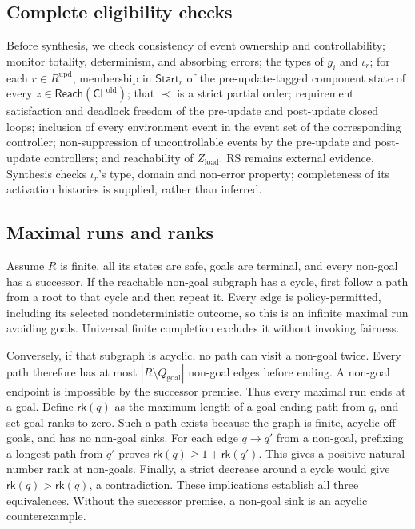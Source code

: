 \documentclass[11pt]{article}
\newcommand{\Goal}{Q_{\mathrm{goal}}}
\newcommand{\rank}{\mathsf{rk}}
\newcommand{\Reach}{\mathsf{Reach}}
\begin{document}
\subsection{Complete eligibility checks}
Before synthesis, we check
consistency of event ownership and controllability;
monitor totality, determinism, and absorbing errors; the types of $g_i$ and $\iota_r$; for each $r\in R^{\mathrm{upd}}$, membership in $\mathsf{Start}_r$ of the pre-update-tagged component state of every $z\in\Reach(\mathsf{CL}^{\mathrm{old}})$;
that $\prec$ is a strict partial order; requirement satisfaction and deadlock freedom of the pre-update and post-update closed loops; inclusion of every environment event in the event set of the corresponding controller;
non-suppression of uncontrollable events by the pre-update and post-update controllers; and
reachability of $Z_{\mathrm{load}}$. RS remains external evidence. Synthesis checks $\iota_r$'s type, domain and non-error property; completeness of its activation histories is supplied, rather than inferred.

\subsection{Maximal runs and ranks}
Assume $R$ is finite, all its states are safe, goals are terminal, and every non-goal has a successor. If the reachable non-goal subgraph has a cycle, first follow a path from a root to that cycle and then repeat it. Every edge is policy-permitted, including its selected nondeterministic outcome, so this is an infinite maximal run avoiding goals. Universal finite completion excludes it without invoking fairness.

Conversely, if that subgraph is acyclic, no path can visit a non-goal twice. Every path therefore has at most $|R\setminus\Goal|$ non-goal edges before ending. A non-goal endpoint is impossible by the successor premise. Thus every maximal run ends at a goal. Define $\rank(q)$ as the maximum length of a goal-ending path from $q$, and set goal ranks to zero. Such a path exists because the graph is finite, acyclic off goals, and has no non-goal sinks. For each edge $q\to q'$ from a non-goal, prefixing a longest path from $q'$ proves $\rank(q)\geq1+\rank(q')$. This gives a positive natural-number rank at non-goals. Finally, a strict decrease around a cycle would give $\rank(q)>\rank(q)$, a contradiction. These implications establish all three equivalences. Without the successor premise, a non-goal sink is an acyclic counterexample.
\end{document}
